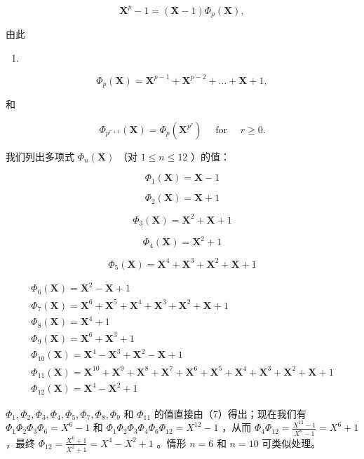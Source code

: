\[
\mathbf {X} ^ {p} - 1 = (\mathbf {X} - 1) \Phi_ {p} (\mathbf {X}),
\]

由此

\begin{enumerate}
\def\labelenumi{(\arabic{enumi})}
\setcounter{enumi}{6}
\tightlist
\item
\end{enumerate}

\[
\Phi_ {p} (\mathbf {X}) = \mathbf {X} ^ {p - 1} + \mathbf {X} ^ {p - 2} + \dots + \mathbf {X} + 1,
\]

和

\[
\Phi_ {p ^ {r + 1}} (\mathbf {X}) = \Phi_ {p} \left(\mathbf {X} ^ {p ^ {r}}\right) \quad \text { for } \quad r \geqslant 0.
\]

我们列出多项式 \(\Phi_n(\mathbf{X})\) （对 \(1 \leqslant n \leqslant 12\) ）的值：

\[
\Phi_ {1} (\mathbf {X}) = \mathbf {X} - 1
\]

\[
\Phi_ {2} (\mathbf {X}) = \mathbf {X} + 1
\]

\[
\Phi_ {3} (\mathbf {X}) = \mathbf {X} ^ {2} + \mathbf {X} + 1
\]

\[
\Phi_ {4} (\mathbf {X}) = \mathbf {X} ^ {2} + 1
\]

\[
\Phi_ {5} (\mathbf {X}) = \mathbf {X} ^ {4} + \mathbf {X} ^ {3} + \mathbf {X} ^ {2} + \mathbf {X} + 1
\]

\[
\begin{array}{l} \Phi_ {6} (\mathbf {X}) = \mathbf {X} ^ {2} - \mathbf {X} + 1 \\ \Phi_ {7} (\mathbf {X}) = \mathbf {X} ^ {6} + \mathbf {X} ^ {5} + \mathbf {X} ^ {4} + \mathbf {X} ^ {3} + \mathbf {X} ^ {2} + \mathbf {X} + 1 \\ \Phi_ {8} (\mathbf {X}) = \mathbf {X} ^ {4} + 1 \\ \Phi_ {9} (\mathbf {X}) = \mathbf {X} ^ {6} + \mathbf {X} ^ {3} + 1 \\ \Phi_ {1 0} (\mathbf {X}) = \mathbf {X} ^ {4} - \mathbf {X} ^ {3} + \mathbf {X} ^ {2} - \mathbf {X} + 1 \\ \Phi_ {1 1} (\mathbf {X}) = \mathbf {X} ^ {1 0} + \mathbf {X} ^ {9} + \mathbf {X} ^ {8} + \mathbf {X} ^ {7} + \mathbf {X} ^ {6} + \mathbf {X} ^ {5} + \mathbf {X} ^ {4} + \mathbf {X} ^ {3} + \mathbf {X} ^ {2} + \mathbf {X} + 1 \\ \Phi_ {1 2} (\mathbf {X}) = \mathbf {X} ^ {4} - \mathbf {X} ^ {2} + 1 \end{array}
\]

\(\Phi_1, \Phi_2, \Phi_3, \Phi_4, \Phi_5, \Phi_7, \Phi_8, \Phi_9\) 和 \(\Phi_{11}\) 的值直接由（7）得出；现在我们有 \(\Phi_1\Phi_2\Phi_3\Phi_6 = X^6 - 1\) 和 \(\Phi_1\Phi_2\Phi_3\Phi_4\Phi_6\Phi_{12} = X^{12} - 1\) ，从而 \(\Phi_4\Phi_{12} = \frac{X^{12} - 1}{X^6 - 1} = X^6 + 1\) ，最终 \(\Phi_{12} = \frac{X^6 + 1}{X^2 + 1} = X^4 - X^2 + 1\) 。情形 \(n = 6\) 和 \(n = 10\) 可类似处理。


